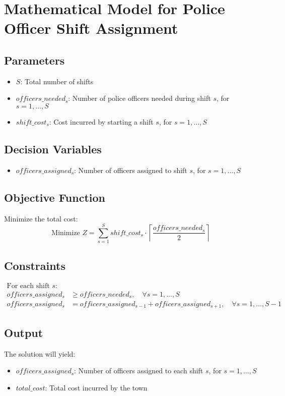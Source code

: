 \documentclass{article}
\begin{document}
\section*{Mathematical Model for Police Officer Shift Assignment}

\subsection*{Parameters}
\begin{itemize}
    \item $S$: Total number of shifts
    \item $officers\_needed_{s}$: Number of police officers needed during shift $s$, for $s = 1, \ldots, S$
    \item $shift\_cost_{s}$: Cost incurred by starting a shift $s$, for $s = 1, \ldots, S$
\end{itemize}

\subsection*{Decision Variables}
\begin{itemize}
    \item $officers\_assigned_{s}$: Number of officers assigned to shift $s$, for $s = 1, \ldots, S$
\end{itemize}

\subsection*{Objective Function}
Minimize the total cost:
\[
\text{Minimize } Z = \sum_{s=1}^{S} shift\_cost_{s} \cdot \left\lceil \frac{officers\_needed_{s}}{2} \right\rceil
\]

\subsection*{Constraints}
\begin{align*}
    \text{For each shift } s: & \\
    officers\_assigned_{s} & \geq officers\_needed_{s}, \quad \forall s = 1, \ldots, S \\
    officers\_assigned_{s} & = officers\_assigned_{s-1} + officers\_assigned_{s+1}, \quad \forall s = 1, \ldots, S-1
\end{align*}

\subsection*{Output}
The solution will yield:
\begin{itemize}
    \item $officers\_assigned_{s}$: Number of officers assigned to each shift $s$, for $s = 1, \ldots, S$
    \item $total\_cost$: Total cost incurred by the town
\end{itemize}
\end{document}
